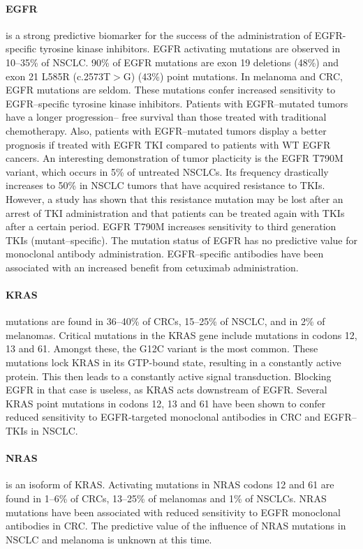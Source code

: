 {{{      \paragraph{EGFR} is a strong predictive biomarker for the success of the
      administration of EGFR-specific tyrosine kinase inhibitors. EGFR
      activating mutations are observed in 10--35\% of NSCLC. 90\% of EGFR
      mutations are exon 19 deletions (48\%) and exon 21 L585R (c.2573T$>$G)
      (43\%) point mutations. In melanoma and CRC, EGFR mutations are seldom.
      These mutations confer increased sensitivity to EGFR--specific tyrosine
      kinase inhibitors. Patients with EGFR--mutated tumors have a longer
      progression-- free survival than those treated with traditional
      chemotherapy. Also, patients with EGFR--mutated tumors display a better
      prognosis if treated with EGFR TKI compared to patients with WT EGFR
      cancers. An interesting demonstration of tumor placticity is the EGFR
      T790M variant, which occurs in 5\% of untreated NSCLCs. Its frequency
      drastically increases to 50\% in NSCLC tumors that have acquired
      resistance to TKIs. However, a study has shown that this resistance
      mutation may be lost after an arrest of TKI administration and that
      patients can be treated again with TKIs after a certain period. EGFR
      T790M increases sensitivity to third generation TKIs (mutant--specific).
      The mutation status of EGFR has no predictive value for monoclonal
      antibody administration. EGFR--specific antibodies have been associated
      with an increased benefit from cetuximab administration.

      \paragraph{KRAS} mutations are found in 36--40\% of CRCs, 15--25\% of
      NSCLC, and in 2\% of melanomas. Critical mutations in the KRAS gene
      include mutations in codons 12, 13 and 61. Amongst these, the G12C variant
      is the most common. These mutations lock KRAS in its GTP-bound state,
      resulting in a constantly active protein. This then leads to a constantly
      active signal transduction. Blocking EGFR in that case is useless, as KRAS
      acts downstream of EGFR. Several KRAS point mutations in codons 12, 13 and
      61 have been shown to confer reduced sensitivity to EGFR-targeted
      monoclonal antibodies in CRC and EGFR--TKIs in NSCLC.

      \paragraph{NRAS} is an isoform of KRAS. Activating mutations in NRAS
      codons 12 and 61 are found in 1--6\% of CRCs, 13--25\% of melanomas and
      1\% of NSCLCs. NRAS mutations have been associated with reduced
      sensitivity to EGFR monoclonal antibodies in CRC. The predictive value of
      the influence of NRAS mutations in NSCLC and
      melanoma is unknown at this time.

}}}
